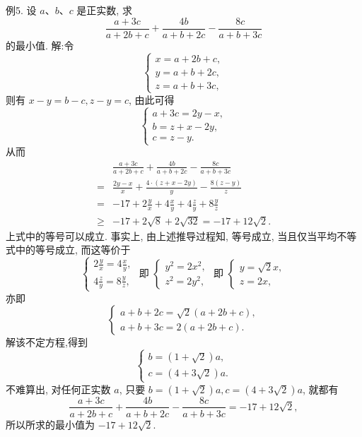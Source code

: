 例5. 设 $a 、 b 、 c$ 是正实数, 求
$$
\frac{a+3 c}{a+2 b+c}+\frac{4 b}{a+b+2 c}-\frac{8 c}{a+b+3 c}
$$
的最小值.
解:令
$$
\left\{\begin{array}{l}
x=a+2 b+c, \\
y=a+b+2 c, \\
z=a+b+3 c,
\end{array}\right.
$$
则有 $x-y=b-c, z-y=c$, 由此可得
$$
\left\{\begin{array}{l}
a+3 c=2 y-x, \\
b=z+x-2 y, \\
c=z-y .
\end{array}\right.
$$
从而
$$
\begin{aligned}
& \frac{a+3 c}{a+2 b+c}+\frac{4 b}{a+b+2 c}-\frac{8 c}{a+b+3 c} \\
= & \frac{2 y-x}{x}+\frac{4 \cdot(z+x-2 y)}{y}-\frac{8(z-y)}{z} \\
= & -17+2 \frac{y}{x}+4 \frac{x}{y}+4 \frac{z}{y}+8 \frac{y}{z} \\
\geqslant & -17+2 \sqrt{8}+2 \sqrt{32}=-17+12 \sqrt{2} .
\end{aligned}
$$
上式中的等号可以成立.
事实上, 由上述推导过程知, 等号成立, 当且仅当平均不等式中的等号成立, 而这等价于
$$
\left\{\begin{array} { l } 
{ 2 \frac { y } { x } = 4 \frac { x } { y } , } \\
{ 4 \frac { z } { y } = 8 \frac { y } { z } , }
\end{array} \text { 即 } \left\{\begin{array} { l } 
{ y ^ { 2 } = 2 x ^ { 2 } , } \\
{ z ^ { 2 } = 2 y ^ { 2 } , }
\end{array} \text { 即 } \left\{\begin{array}{l}
y=\sqrt{2} x, \\
z=2 x,
\end{array}\right.\right.\right.
$$
亦即
$$
\left\{\begin{array}{l}
a+b+2 c=\sqrt{2}(a+2 b+c), \\
a+b+3 c=2(a+2 b+c) .
\end{array}\right.
$$
解该不定方程,得到
$$
\left\{\begin{array}{l}
b=(1+\sqrt{2}) a, \\
c=(4+3 \sqrt{2}) a .
\end{array}\right.
$$
不难算出, 对任何正实数 $a$, 只要 $b=(1+\sqrt{2}) a, c=(4+3 \sqrt{2}) a$, 就都有
$$
\frac{a+3 c}{a+2 b+c}+\frac{4 b}{a+b+2 c}-\frac{8 c}{a+b+3 c}=-17+12 \sqrt{2},
$$
所以所求的最小值为 $-17+12 \sqrt{2}$.



